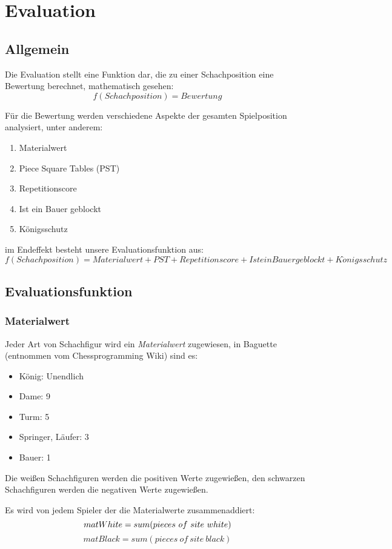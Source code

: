\section{Evaluation}\label{eval}
\subsection{Allgemein}
Die Evaluation stellt eine Funktion dar, die zu einer Schachposition eine Bewertung berechnet, mathematisch gesehen: 
$$
f(Schachposition) = Bewertung
$$

Für die Bewertung werden verschiedene Aspekte der gesamten Spielposition analysiert, unter anderem: 
\begin{enumerate}
    \item{Materialwert}
    \item{Piece Square Tables (PST)}
    \item{Repetitionscore}
    \item{Ist ein Bauer geblockt}
    \item{K\"onigsschutz}
\end{enumerate}

im Endeffekt besteht unsere Evaluationsfunktion aus:
$$
f(Schachposition) = Materialwert + PST + Repetitionscore + Ist ein Bauer geblockt + K\ddot{o}nigsschutz
$$

\subsection{Evaluationsfunktion}

\subsubsection{Materialwert}
Jeder Art von Schachfigur wird ein \textit{Materialwert} zugewiesen, in Baguette (entnommen vom Chessprogramming Wiki) sind es:
\begin{itemize}
    \item{König: Unendlich} 
    \item{Dame: 9}
    \item{Turm: 5}
    \item{Springer, Läufer: 3}
    \item{Bauer: 1}
\end{itemize}
Die weißen Schachfiguren werden die positiven Werte zugewießen, den schwarzen Schachfiguren werden die negativen Werte zugewießen.

Es wird von jedem Spieler der die Materialwerte zusammenaddiert:
$$
matWhite = sum(pieces\ of\ site\ white) \\
$$
$$
matBlack = sum(pieces\ of\ site\ black)
$$

